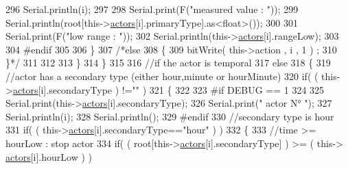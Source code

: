 \begin{DoxyCode}
296                             Serial.println(i);
297 
298                             Serial.print(F(\textcolor{stringliteral}{"measured value : "}));
299                             Serial.println(root[this->\hyperlink{class_jetpack_a7e16d2f97837f9712a2e6de1c50d99db}{actors}[i].primaryType].as<float>());
300 
301                             Serial.print(F(\textcolor{stringliteral}{"low range : "}));
302                             Serial.println(this->\hyperlink{class_jetpack_a7e16d2f97837f9712a2e6de1c50d99db}{actors}[i].rangeLow);
303                         
304 \textcolor{preprocessor}{                        #endif}
305                                             
306                         \}
307                         \textcolor{comment}{/*else }
308 \textcolor{comment}{                        \{}
309 \textcolor{comment}{                            bitWrite( this->action , i , 1 ) ;                      }
310 \textcolor{comment}{                        \}*/}
311 
312                     
313                     \}
314                 \}
315 
316                 \textcolor{comment}{//if the actor is temporal}
317                 \textcolor{keywordflow}{else}
318                 \{
319                     \textcolor{comment}{//actor has a secondary type (either hour,minute or hourMinute)}
320                     \textcolor{keywordflow}{if}( ( this->\hyperlink{class_jetpack_a7e16d2f97837f9712a2e6de1c50d99db}{actors}[i].secondaryType ) !=\textcolor{stringliteral}{""} )  
321                     \{
322                     
323 \textcolor{preprocessor}{                    #if DEBUG == 1}
324                         
325                         Serial.print(this->\hyperlink{class_jetpack_a7e16d2f97837f9712a2e6de1c50d99db}{actors}[i].secondaryType);
326                         Serial.print(\textcolor{stringliteral}{" actor N° "});
327                         Serial.println(i);
328                         Serial.println();
329 \textcolor{preprocessor}{                    #endif}
330                         \textcolor{comment}{//secondary type is hour    }
331                         \textcolor{keywordflow}{if}( ( this->\hyperlink{class_jetpack_a7e16d2f97837f9712a2e6de1c50d99db}{actors}[i].secondaryType==\textcolor{stringliteral}{"hour"} ) )
332                         \{
333                             \textcolor{comment}{//time >= hourLow : stop actor}
334                             \textcolor{keywordflow}{if}( ( root[this->\hyperlink{class_jetpack_a7e16d2f97837f9712a2e6de1c50d99db}{actors}[i].secondaryType] ) >= ( this->
      \hyperlink{class_jetpack_a7e16d2f97837f9712a2e6de1c50d99db}{actors}[i].hourLow ) )     

\end{DoxyCode}
